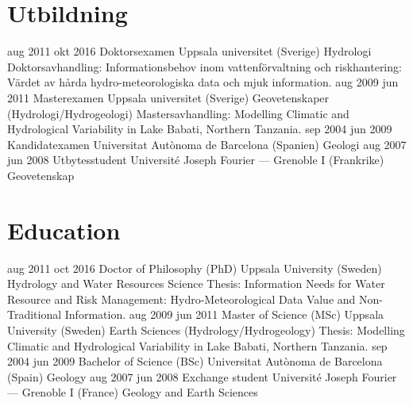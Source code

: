 \ifswedish
    \section{Utbildning}
        \position
            {aug 2011 \textemdash{} okt 2016}
            {Doktorsexamen}
            {Uppsala universitet (Sverige)}
            {Hydrologi \newline
            Doktorsavhandling: Informationsbehov inom vattenförvaltning och riskhantering: Värdet av hårda hydro-meteorologiska data och mjuk information.}
        \position
            {aug 2009 \textemdash{} jun 2011}
            {Masterexamen}
            {Uppsala universitet (Sverige)}
            {Geovetenskaper (Hydrologi/Hydrogeologi) \newline
            Mastersavhandling: Modelling Climatic and Hydrological Variability in Lake Babati, Northern Tanzania.}
        \position
            {sep 2004 \textemdash{} jun 2009}
            {Kandidatexamen}
            {Universitat Autònoma de Barcelona (Spanien)}
            {Geologi}
        \position
            {aug 2007 \textemdash{} jun 2008}
            {Utbytesstudent}
            {Université Joseph Fourier --- Grenoble I (Frankrike)}
            {Geovetenskap}
\else
    \section{Education}
        \position
            {aug 2011 \textemdash{} oct 2016}
            {Doctor of Philosophy (PhD)}
            {Uppsala University (Sweden)}
            {Hydrology and Water Resources Science \newline
            Thesis: Information Needs for Water Resource and Risk Management: Hydro-Meteorological Data Value and Non-Traditional Information.}
        \position
            {aug 2009 \textemdash{} jun 2011}
            {Master of Science (MSc)}
            {Uppsala University (Sweden)}
            {Earth Sciences (Hydrology/Hydrogeology) \newline
            Thesis: Modelling Climatic and Hydrological Variability in Lake Babati, Northern Tanzania.}
        \position
            {sep 2004 \textemdash{} jun 2009}
            {Bachelor of Science (BSc)}
            {Universitat Autònoma de Barcelona (Spain)}
            {Geology}
        \position
            {aug 2007 \textemdash{} jun 2008}
            {Exchange student}
            {Université Joseph Fourier --- Grenoble I (France)}
            {Geology and Earth Sciences}
\fi